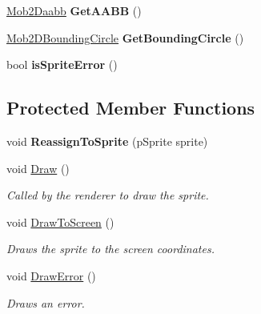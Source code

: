 \begin{DoxyCompactItemize}
\item 
\hypertarget{classmob2d__node_a3e1d46c4d90ea1ddf723857267cda87a}{
\hyperlink{structMob2Daabb}{Mob2Daabb} {\bfseries GetAABB} ()}
\label{classmob2d__node_a3e1d46c4d90ea1ddf723857267cda87a}

\item 
\hypertarget{classmob2d__node_a6caba38dd87f69f56eb6ddf7dc5af30f}{
\hyperlink{structMob2DBoundingCircle}{Mob2DBoundingCircle} {\bfseries GetBoundingCircle} ()}
\label{classmob2d__node_a6caba38dd87f69f56eb6ddf7dc5af30f}

\item 
\hypertarget{classmob2d__node_a22babc8357027d7ec48b2ff2db4de851}{
bool {\bfseries isSpriteError} ()}
\label{classmob2d__node_a22babc8357027d7ec48b2ff2db4de851}

\end{DoxyCompactItemize}
\subsection*{Protected Member Functions}
\begin{DoxyCompactItemize}
\item 
\hypertarget{classmob2d__node_a870ae77e6f8794d0f66b4e8ee41d0161}{
void {\bfseries ReassignToSprite} (pSprite sprite)}
\label{classmob2d__node_a870ae77e6f8794d0f66b4e8ee41d0161}

\item 
\hypertarget{classmob2d__node_aae85dd6f826e5cd2b9868ccbbf4461f7}{
void \hyperlink{classmob2d__node_aae85dd6f826e5cd2b9868ccbbf4461f7}{Draw} ()}
\label{classmob2d__node_aae85dd6f826e5cd2b9868ccbbf4461f7}

\begin{DoxyCompactList}\small\item\em Called by the renderer to draw the sprite. \item\end{DoxyCompactList}\item 
\hypertarget{classmob2d__node_ac9b5215b21ad8e97db68055f49a6e04b}{
void \hyperlink{classmob2d__node_ac9b5215b21ad8e97db68055f49a6e04b}{DrawToScreen} ()}
\label{classmob2d__node_ac9b5215b21ad8e97db68055f49a6e04b}

\begin{DoxyCompactList}\small\item\em Draws the sprite to the screen coordinates. \item\end{DoxyCompactList}\item 
\hypertarget{classmob2d__node_ada92b464b4b0b20fe0dc99eb6fd3b5bd}{
void \hyperlink{classmob2d__node_ada92b464b4b0b20fe0dc99eb6fd3b5bd}{DrawError} ()}
\label{classmob2d__node_ada92b464b4b0b20fe0dc99eb6fd3b5bd}

\begin{DoxyCompactList}\small\item\em Draws an error. \item\end{DoxyCompactList}\end{DoxyCompactItemize}
